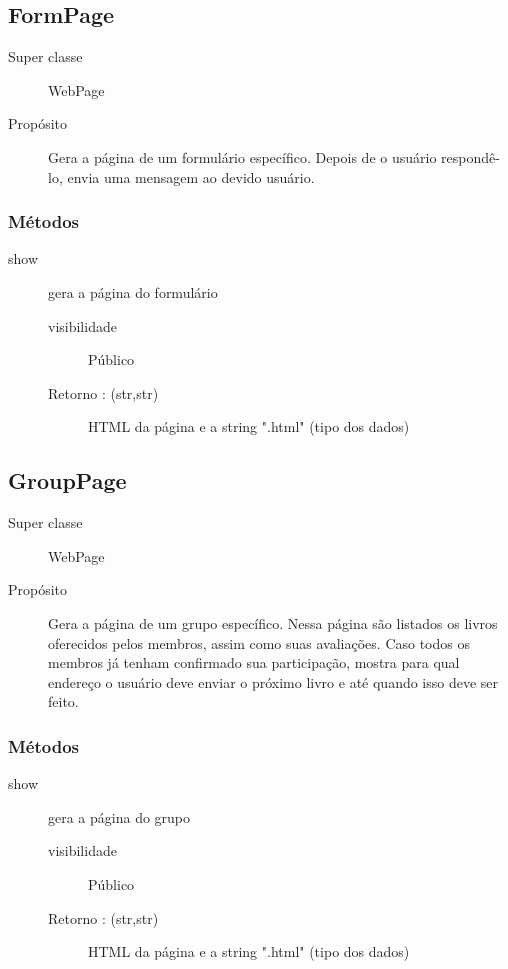 \documentclass[a4paper]{article}
\begin{document}
	\subsection{FormPage}
	
	\begin{description}
		\item [Super classe] WebPage
		\item [Propósito] Gera a página de um formulário específico. Depois de o usuário respondê-lo, envia uma mensagem ao devido usuário.
	\end{description}
	
	\subsubsection{Métodos}
		\begin{description} %
		 \item [show] gera a página do formulário
			\begin{description} %
				\item [visibilidade] Público			 
				\item [Retorno : (str,str)] HTML da página e a string ".html" (tipo dos dados)
			\end{description} %
		\end{description} %
	
	\subsection{GroupPage}
	
	\begin{description}
		\item [Super classe] WebPage
		\item [Propósito] Gera a página de um grupo específico. Nessa página são listados os livros oferecidos pelos membros, assim como suas avaliações. Caso todos os membros já tenham confirmado sua participação, mostra para qual endereço o usuário deve enviar o próximo livro e até quando isso deve ser feito.
	\end{description}
	
	\subsubsection{Métodos}
		\begin{description} %
		 \item [show] gera a página do grupo
			\begin{description} %
				\item [visibilidade] Público			 
				\item [Retorno : (str,str)] HTML da página e a string ".html" (tipo dos dados)
			\end{description} %
		\end{description} %
	
\end{document}
